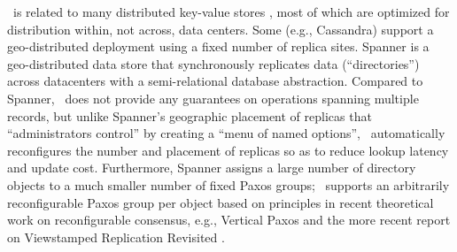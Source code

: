 

\auspice\ is related to many distributed key-value stores \cite{mongodb,Escriva,cassandra}, most of which are optimized for distribution within, not across, data centers. Some (e.g., Cassandra) support a geo-distributed deployment using a fixed number of replica sites. Spanner \cite{spanner} is a geo-distributed data store that synchronously replicates data (``directories'') across datacenters with a semi-relational database abstraction. Compared to Spanner, \auspice\ does not provide any guarantees on operations spanning multiple records, but unlike Spanner's geographic placement of replicas that  ``administrators control'' by creating a ``menu of named options'',  \auspice\  automatically reconfigures the number and placement of replicas so as to reduce lookup latency and update cost. Furthermore, Spanner assigns a large number of directory objects to a much smaller number of fixed Paxos groups; \auspice\ supports an arbitrarily reconfigurable Paxos group per object based on principles in recent theoretical work on reconfigurable consensus, e.g., Vertical Paxos \cite{vertical-paxos} and the more recent report on Viewstamped Replication Revisited \cite{liskov12vr}.

